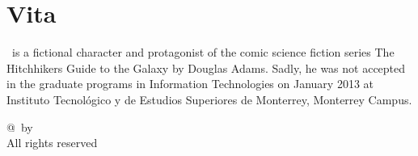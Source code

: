 \chapter*{Vita} \label{Vita}


\begin{center}
\end{center}

\authorName\ is a fictional character and  
protagonist of the comic science fiction series The Hitchhikers
 Guide to the Galaxy by Douglas Adams. 
Sadly, he was not accepted in the graduate programs in Information Technologies  
on January 2013 at Instituto Tecnológico y de Estudios Superiores de 
Monterrey, Monterrey Campus.

\begin{center}
\end{center}

\begin{center}
	{@}\thesisYear\ by \authorName \\
	All rights reserved
\end{center}

\null
\vfill

\begin{center}
	\packageDetails
\end{center}

\begin{center}
    \textbf{\thesisDate} 
\end{center}


